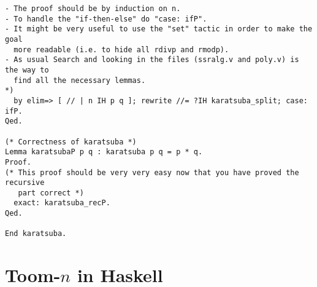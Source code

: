 \documentclass[a4paper]{article}
\begin{document}
\begin{verbatim}
- The proof should be by induction on n.
- To handle the "if-then-else" do "case: ifP".
- It might be very useful to use the "set" tactic in order to make the goal
  more readable (i.e. to hide all rdivp and rmodp).
- As usual Search and looking in the files (ssralg.v and poly.v) is the way to
  find all the necessary lemmas.
*)
  by elim=> [ // | n IH p q ]; rewrite //= ?IH karatsuba_split; case: ifP.
Qed.

(* Correctness of karatsuba *)
Lemma karatsubaP p q : karatsuba p q = p * q.
Proof.
(* This proof should be very very easy now that you have proved the recursive
   part correct *)
  exact: karatsuba_recP.
Qed.

End karatsuba.
\end{verbatim}

\section{Toom-$n$ in Haskell}
\end{document}
